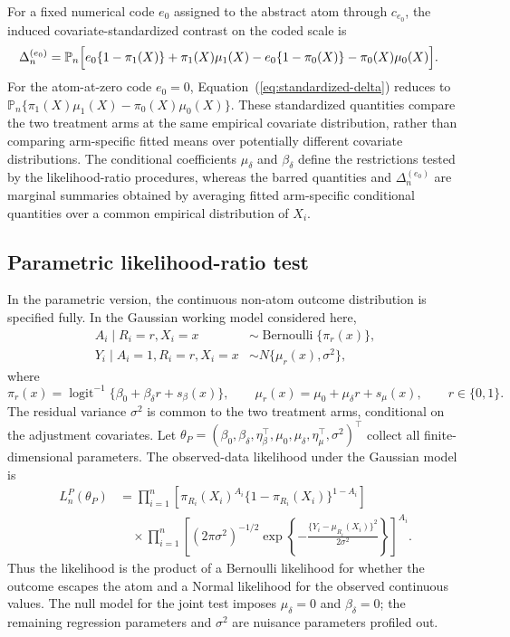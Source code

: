 \documentclass[11pt]{article}
\DeclareMathOperator*{\logit}{logit}
\DeclareMathOperator*{\Bernoulli}{Bernoulli}
\begin{document}
For a fixed numerical code $e_0$ assigned to the abstract atom through $c_{e_0}$, the induced covariate-standardized contrast on the coded scale is
\begin{align}
  \Delta_n^{(e_0)}
  &=
  \mathbb{P}_n
  \Bigl[
    e_0\{1-\pi_1(X)\}
    + \pi_1(X)\mu_1(X)
    - e_0\{1-\pi_0(X)\}
    - \pi_0(X)\mu_0(X)
  \Bigr].
  \label{eq:standardized-delta}
\end{align}
For the atom-at-zero code $e_0=0$, Equation~(\ref{eq:standardized-delta}) reduces to $\mathbb{P}_n\{\pi_1(X)\mu_1(X)-\pi_0(X)\mu_0(X)\}$. These standardized quantities compare the two treatment arms at the same empirical covariate distribution, rather than comparing arm-specific fitted means over potentially different covariate distributions. The conditional coefficients $\mu_\delta$ and $\beta_\delta$ define the restrictions tested by the likelihood-ratio procedures, whereas the barred quantities and $\Delta_n^{(e_0)}$ are marginal summaries obtained by averaging fitted arm-specific conditional quantities over a common empirical distribution of $X_i$.

\subsection{Parametric likelihood-ratio test}

In the parametric version, the continuous non-atom outcome distribution is specified fully. In the Gaussian working model considered here,
\begin{align*}
  A_i \mid R_i = r, X_i = x
  &\sim \Bernoulli\{\pi_r(x)\},\\
  Y_i \mid A_i = 1, R_i = r, X_i = x
  &\sim N\{\mu_r(x),\sigma^2\},
\end{align*}
where
\[
  \pi_r(x)
  =
  \logit^{-1}\{\beta_0 + \beta_\delta r + s_\beta(x)\},
  \qquad
  \mu_r(x)
  =
  \mu_0 + \mu_\delta r + s_\mu(x),
  \qquad r \in \{0,1\}.
\]
The residual variance $\sigma^2$ is common to the two treatment arms, conditional on the adjustment covariates. Let $\theta_P = (\beta_0,\beta_\delta,\eta_\beta^\top,\mu_0,\mu_\delta,\eta_\mu^\top,\sigma^2)^\top$ collect all finite-dimensional parameters. The observed-data likelihood under the Gaussian model is
\begin{align*}
  L_n^P(\theta_P)
  &=
  \prod_{i = 1}^n
  \left[
    \pi_{R_i}(X_i)^{A_i}
    \{1-\pi_{R_i}(X_i)\}^{1-A_i}
  \right]\\
  &\quad \times
  \prod_{i = 1}^n
  \left[
    (2\pi\sigma^2)^{-1/2}
    \exp\left\{-\frac{\{Y_i-\mu_{R_i}(X_i)\}^2}{2\sigma^2}\right\}
  \right]^{A_i}.
\end{align*}
Thus the likelihood is the product of a Bernoulli likelihood for whether the outcome escapes the atom and a Normal likelihood for the observed continuous values. The null model for the joint test imposes $\mu_\delta = 0$ and $\beta_\delta = 0$; the remaining regression parameters and $\sigma^2$ are nuisance parameters profiled out.
\end{document}

